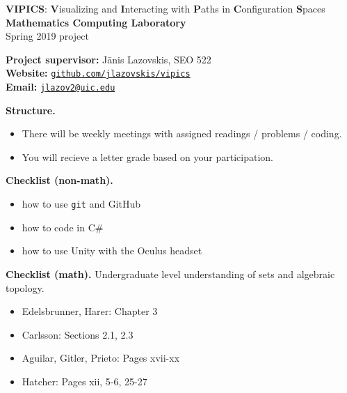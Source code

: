 \documentclass[10pt]{article}
\begin{document}
\def\vspacing{\vspace{.5cm}}

\noindent

\begin{center}
\large \textbf{VIPICS}: \textbf{V}isualizing and \textbf{I}nteracting with \textbf{P}aths in \textbf{C}onfiguration \textbf{S}paces
\\[5pt]\normalsize \textbf{Mathematics Computing Laboratory} \\
Spring 2019 project
\end{center}

\vspacing
 
\noindent
\textbf{Project supervisor:} J\=anis Lazovskis, SEO 522 \\
\textbf{Website:} \href{https://github.com/jlazovskis/vipics}{\texttt{github.com/jlazovskis/vipics}} \\
\textbf{Email:}  \href{mailto:jlazov2@uic.edu}{\nolinkurl{jlazov2@uic.edu}}

\vspacing

\noindent
\textbf{Structure.}
\begin{itemize}
\item There will be weekly meetings with assigned readings / problems / coding.
\item You will recieve a letter grade based on your participation.
\end{itemize}

\vspacing

\noindent
\textbf{Checklist (non-math).} 
\begin{itemize}
\item how to use \texttt{git} and GitHub
\item how to code in C\#
\item how to use Unity with the Oculus headset
\end{itemize}

\vspacing

\noindent
\textbf{Checklist (math).} Undergraduate level understanding of sets and algebraic topology.
\begin{itemize}
\item Edelsbrunner, Harer: Chapter 3
\item Carlsson: Sections 2.1, 2.3
\item Aguilar, Gitler, Prieto: Pages xvii-xx
\item Hatcher: Pages xii, 5-6, 25-27
\end{itemize}

\end{document}
